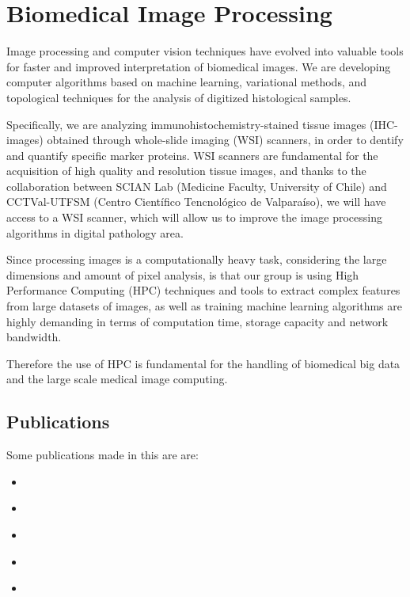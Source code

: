 \section{Biomedical Image Processing}

Image processing and computer vision techniques have evolved into valuable
tools for faster and improved interpretation of biomedical images.
We are developing computer algorithms based on machine learning, variational
methods, and topological techniques for the analysis of digitized histological
samples.

Specifically, we are analyzing immunohistochemistry-stained tissue images
(IHC-images) obtained through whole-slide imaging (WSI) scanners, in order to
dentify and quantify specific marker proteins.
WSI scanners are fundamental for the acquisition of high quality and resolution
tissue images, and thanks to the collaboration between SCIAN Lab (Medicine Faculty,
University of Chile) and CCTVal-UTFSM (Centro Científico Tencnológico de
Valparaíso), we will have access to a WSI scanner,  which will allow us to improve
the image processing algorithms in digital pathology area.

Since processing images is a computationally heavy task,
considering the large dimensions and amount of pixel analysis,
is that our group is using High Performance Computing (HPC) techniques
and tools to extract complex features from large datasets of images,
as well as training machine learning algorithms are highly demanding in terms
of computation time, storage capacity and network bandwidth.

Therefore the use of HPC is fundamental for the handling of biomedical big data
and the large scale medical image computing.

\subsection{Publications}

Some publications made in this are are:
\begin{itemize}
    \item \cite{pezoa2014}
    \item \cite{pezoa2012}
    \item \cite{pezoaGold}
    \item \cite{pezoa2011b}
    \item \cite{pezoa2011a}
\end{itemize}

